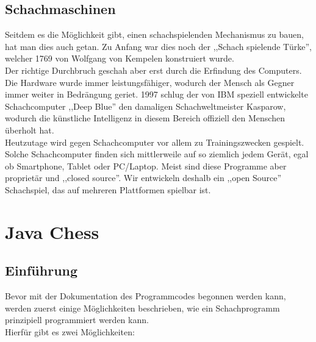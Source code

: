 \documentclass[12pt,a4paper]{article}
\begin{document}

\newpage
\subsection{Schachmaschinen}
\label{SUBSUBSEC:CHESS-COMPUTERS}

Seitdem es die Möglichkeit gibt, einen schachspielenden Mechanismus zu bauen, hat man dies auch getan. Zu Anfang war dies noch der ,,Schach spielende Türke'', welcher 1769 von Wolfgang von Kempelen konstruiert wurde. \cite{wiki:chess} \\ 
Der richtige Durchbruch geschah aber erst durch die Erfindung des Computers. Die Hardware wurde immer leistungsfähiger, wodurch der Mensch als Gegner immer weiter in Bedrängung geriet. 1997 schlug der von IBM speziell entwickelte Schachcomputer ,,Deep Blue'' den damaligen Schachweltmeister Kasparow, wodurch die künstliche Intelligenz in diesem Bereich offiziell den Menschen überholt hat. \\
Heutzutage wird gegen Schachcomputer vor allem zu Trainingszwecken gespielt. Solche Schachcomputer finden sich mittlerweile auf so ziemlich jedem Gerät, egal ob Smartphone, Tablet oder PC/Laptop. Meist sind diese Programme aber proprietär und ,,closed source''. Wir entwickeln deshalb ein ,,open Source'' Schachspiel, das auf mehreren Plattformen spielbar ist.
 
\clearpage\vfill\newpage{}

\section{Java Chess}
\label{SEC:JAVACHESS}

\subsection{Einführung}
\label{SUBSEC:JAVACHESS-INTRO}

Bevor mit der Dokumentation des Programmcodes begonnen werden kann, werden zuerst einige Möglichkeiten beschrieben, wie ein Schachprogramm prinzipiell programmiert werden kann.\\
Hierfür gibt es zwei Möglichkeiten:
\end{document}
